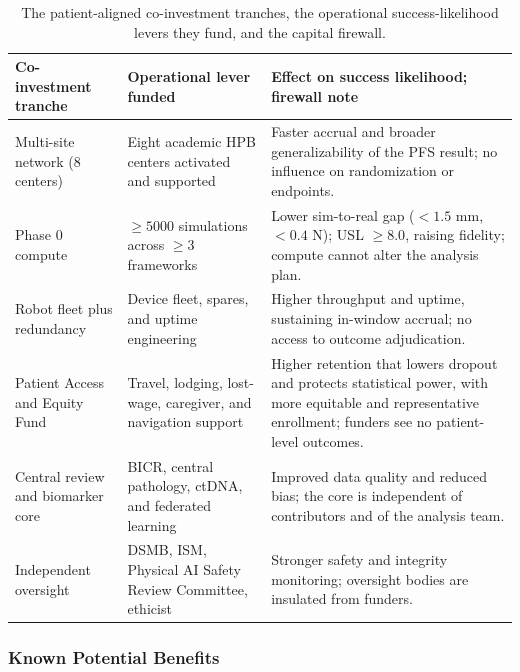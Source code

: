\begin{table}[t]\centering\footnotesize
\caption{The patient-aligned co-investment tranches, the operational
success-likelihood levers they fund, and the capital firewall.}
\label{tab:coinvest}
\begin{tabularx}{\textwidth}{L{3.2cm} L{4.3cm} Y}
\toprule
\textbf{Co-investment tranche} & \textbf{Operational lever funded} & \textbf{Effect on success likelihood; firewall note} \\
\midrule
Multi-site network (8 centers) & Eight academic HPB centers activated and supported & Faster accrual and broader generalizability of the PFS result; no influence on randomization or endpoints. \\
Phase 0 compute & $\geq 5000$ simulations across $\geq 3$ frameworks & Lower sim-to-real gap ($< 1.5$ mm, $< 0.4$ N); USL $\geq 8.0$, raising fidelity; compute cannot alter the analysis plan. \\
Robot fleet plus redundancy & Device fleet, spares, and uptime engineering & Higher throughput and uptime, sustaining in-window accrual; no access to outcome adjudication. \\
Patient Access and Equity Fund & Travel, lodging, lost-wage, caregiver, and navigation support & Higher retention that lowers dropout and protects statistical power, with more equitable and representative enrollment; funders see no patient-level outcomes. \\
Central review and biomarker core & BICR, central pathology, ctDNA, and federated learning & Improved data quality and reduced bias; the core is independent of contributors and of the analysis team. \\
Independent oversight & DSMB, ISM, Physical AI Safety Review Committee, ethicist & Stronger safety and integrity monitoring; oversight bodies are insulated from funders. \\
\bottomrule
\end{tabularx}
\end{table}





\vspace{-0.2cm}

\subsubsection{Known Potential Benefits}

